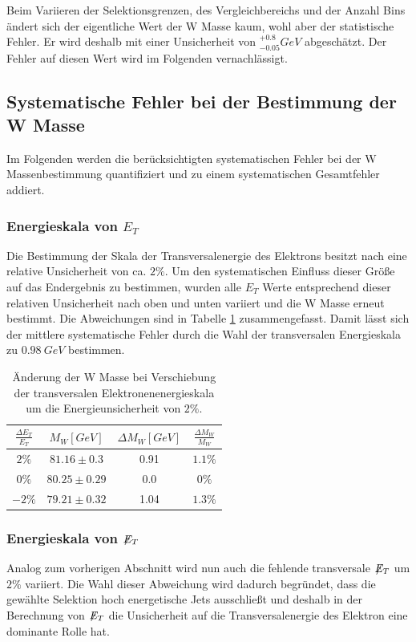 \documentclass[a4paper,12pt]{article}
\newcommand{\met}{\ensuremath{\not\mathrel{E}}_T}
\begin{document}
Beim Variieren der Selektionsgrenzen, des Vergleichbereichs und der Anzahl Bins ändert sich der
eigentliche Wert der W Masse kaum, wohl aber der statistische Fehler. Er wird deshalb mit einer
Unsicherheit von $^{+0.8}_{-0.05}\si{GeV}$ abgeschätzt. Der Fehler auf diesen Wert wird im Folgenden
vernachlässigt.

\subsection{Systematische Fehler bei der Bestimmung der W Masse}
\label{sysunc}
Im Folgenden werden die berücksichtigten systematischen Fehler bei der W Massenbestimmung quantifiziert und zu einem systematischen Gesamtfehler
addiert.
\subsubsection*{Energieskala von $E_{T}$}
Die Bestimmung der Skala der Transversalenergie des Elektrons besitzt nach \cite{Abachi:1996ey} eine relative Unsicherheit von ca. $2\%$. Um den systematischen Einfluss
dieser Größe auf das Endergebnis zu bestimmen, wurden alle $E_{T}$ Werte entsprechend dieser relativen Unsicherheit nach oben und unten variiert und die
W Masse erneut bestimmt. Die Abweichungen sind in Tabelle \ref{tab:syset} zusammengefasst. Damit lässt sich der mittlere systematische Fehler durch die
Wahl der transversalen Energieskala zu $\SI{0.98}{GeV}$ bestimmen.

\begin{table}[h]
	\centering
	\begin{tabular}{c| c c c}
		$\frac{\Delta E_{T}}{E_{T}}$ & $M_{W} [\si{GeV}]$ & $\Delta M_{W}[GeV]$ &$\frac{\Delta M_{W}}{M_{W}}$\\
		\hline
		$2\%$ & $81.16\pm 0.3$ & 0.91 & $1.1\%$\\
		$0\%$ & $80.25\pm 0.29$ & 0.0 & $0\%$ \\
		$-2\%$ & $79.21\pm 0.32$ & 1.04 &$1.3\%$
	\end{tabular}
	\caption{Änderung der W Masse bei Verschiebung der transversalen Elektronenenergieskala um die
	Energieunsicherheit von $2\%$.}
	\label{tab:syset}
\end{table}
\subsubsection*{Energieskala von $\met$}
Analog zum vorherigen Abschnitt wird nun auch die fehlende transversale $\met$ um $2\%$  variiert. Die Wahl dieser Abweichung wird dadurch begründet, dass
die gewählte Selektion hoch energetische Jets ausschließt und deshalb in der Berechnung von $\met$ die Unsicherheit
auf die Transversalenergie des Elektron eine dominante Rolle hat.
\end{document}
